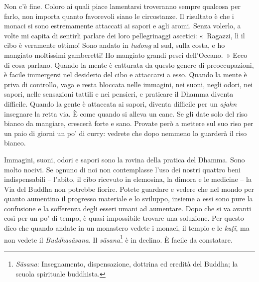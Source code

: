 Non c'è fine. Coloro ai quali piace lamentarsi troveranno sempre
qualcosa per farlo, non importa quanto favorevoli siano le circostanze.
Il risultato è che i monaci si sono estremamente attaccati ai sapori e
agli aromi. Senza volerlo, a volte mi capita di sentirli parlare dei
loro pellegrinaggi ascetici: «~Ragazzi, lì il cibo è veramente ottimo!
Sono andato in \emph{tudong} al sud, sulla costa, e ho mangiato
moltissimi gamberetti! Ho mangiato grandi pesci dell'Oceano.~» Ecco di
cosa parlano. Quando la mente è catturata da questo genere di
preoccupazioni, è facile immergersi nel desiderio del cibo e attaccarsi
a esso. Quando la mente è priva di controllo, vaga e resta bloccata
nelle immagini, nei suoni, negli odori, nei sapori, nelle sensazioni
tattili e nei pensieri, e praticare il Dhamma diventa difficile. Quando
la gente è attaccata ai sapori, diventa difficile per un \emph{ajahn}
insegnare la retta via. È come quando si alleva un cane. Se gli date
solo del riso bianco da mangiare, crescerà forte e sano. Provate però a
mettere sul suo riso per un paio di giorni un po' di curry: vedrete che
dopo nemmeno lo guarderà il riso bianco.

Immagini, suoni, odori e sapori sono la rovina della pratica del Dhamma.
Sono molto nocivi. Se ognuno di noi non contemplasse l'uso dei nostri
quattro beni indispensabili -- l'abito, il cibo ricevuto in elemosina,
la dimora e le medicine -- la Via del Buddha non potrebbe fiorire.
Potete guardare e vedere che nel mondo per quanto aumentino il progresso
materiale e lo sviluppo, insieme a essi sono pure la confusione e la
sofferenza degli esseri umani ad aumentare. Dopo che si va avanti così
per un po' di tempo, è quasi impossibile trovare una soluzione. Per
questo dico che quando andate in un monastero vedete i monaci, il tempio
e le \emph{kuṭī}, ma non vedete il \emph{Buddhasāsana}. Il
\emph{sāsana}\footnote{\emph{Sāsana}: Insegnamento, dispensazione,
  dottrina ed eredità del Buddha; la scuola spirituale buddhista.} è in
declino. È facile da constatare.

